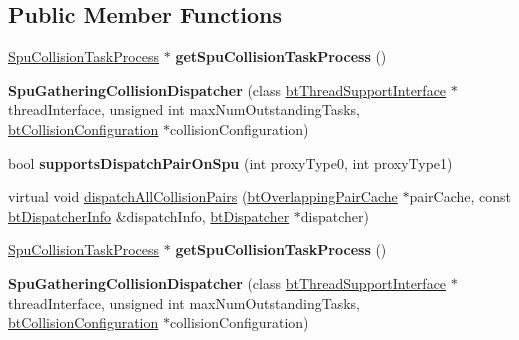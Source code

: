 \subsection*{Public Member Functions}
\begin{DoxyCompactItemize}
\item 
\mbox{\label{classSpuGatheringCollisionDispatcher_a161ec31e4f2d95b31c42247ca4793361}} 
\hyperlink{classSpuCollisionTaskProcess}{Spu\+Collision\+Task\+Process} $\ast$ {\bfseries get\+Spu\+Collision\+Task\+Process} ()
\item 
\mbox{\label{classSpuGatheringCollisionDispatcher_a41acdb98571a2159f5b7b3c406930d55}} 
{\bfseries Spu\+Gathering\+Collision\+Dispatcher} (class \hyperlink{classbtThreadSupportInterface}{bt\+Thread\+Support\+Interface} $\ast$thread\+Interface, unsigned int max\+Num\+Outstanding\+Tasks, \hyperlink{classbtCollisionConfiguration}{bt\+Collision\+Configuration} $\ast$collision\+Configuration)
\item 
\mbox{\label{classSpuGatheringCollisionDispatcher_a47119970f11e80bd70b322ad2556d1b2}} 
bool {\bfseries supports\+Dispatch\+Pair\+On\+Spu} (int proxy\+Type0, int proxy\+Type1)
\item 
virtual void \hyperlink{classSpuGatheringCollisionDispatcher_a320d5506ca57092359f6508f12196ddb}{dispatch\+All\+Collision\+Pairs} (\hyperlink{classbtOverlappingPairCache}{bt\+Overlapping\+Pair\+Cache} $\ast$pair\+Cache, const \hyperlink{structbtDispatcherInfo}{bt\+Dispatcher\+Info} \&dispatch\+Info, \hyperlink{classbtDispatcher}{bt\+Dispatcher} $\ast$dispatcher)
\item 
\mbox{\label{classSpuGatheringCollisionDispatcher_a161ec31e4f2d95b31c42247ca4793361}} 
\hyperlink{classSpuCollisionTaskProcess}{Spu\+Collision\+Task\+Process} $\ast$ {\bfseries get\+Spu\+Collision\+Task\+Process} ()
\item 
\mbox{\label{classSpuGatheringCollisionDispatcher_a41acdb98571a2159f5b7b3c406930d55}} 
{\bfseries Spu\+Gathering\+Collision\+Dispatcher} (class \hyperlink{classbtThreadSupportInterface}{bt\+Thread\+Support\+Interface} $\ast$thread\+Interface, unsigned int max\+Num\+Outstanding\+Tasks, \hyperlink{classbtCollisionConfiguration}{bt\+Collision\+Configuration} $\ast$collision\+Configuration)

\end{DoxyCompactItemize}
